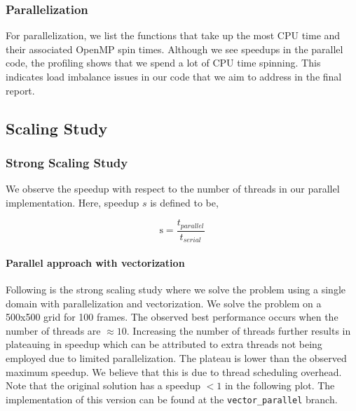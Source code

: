 \documentclass[11pt]{article}
\begin{document}
\subsubsection{Parallelization}
For parallelization, we list the functions that take up the most CPU time and their associated OpenMP spin times. Although we see speedups in the parallel code, the profiling shows that we spend a lot of CPU time spinning. This indicates load imbalance issues in our code that we aim to address in the final report. 



\subsection{Scaling Study} \label{sec:speedup}


\subsubsection{Strong Scaling Study}
We observe the speedup with respect to the number of threads in our parallel implementation. Here, speedup $s$ is defined to be,  

\begin{equation}
	\mathrm{s} = \dfrac{t_{parallel}}{t_{serial}}
\end{equation}

\paragraph{Parallel approach with vectorization}

Following is the strong scaling study where we solve the problem using a single domain with parallelization and vectorization. We solve the problem on a 500x500 grid for 100 frames. The observed best performance occurs when the number of threads are $\approx10$. Increasing the number of threads further results in plateauing in speedup which can be attributed to extra threads not being employed due to limited parallelization. The plateau is lower than the observed maximum speedup. We believe that this is due to thread scheduling overhead. Note that the original solution has a speedup $< 1$ in the following plot. The implementation of this version can be found at the \texttt{vector\_parallel} branch.
\end{document}
